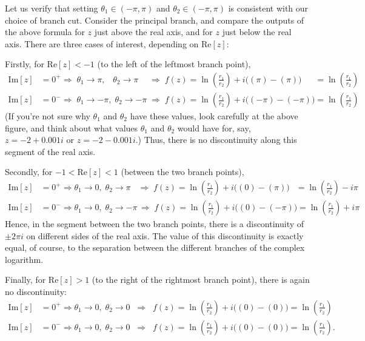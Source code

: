 \documentclass[10pt,a4paper]{article}
\begin{document}
Let us verify that setting $\theta_1 \in (-\pi,\pi)$ and $\theta_2 \in
(-\pi,\pi)$ is consistent with our choice of branch cut. Consider the
principal branch, and compare the outputs of the above formula for $z$
just above the real axis, and for $z$ just below the real axis.  There
are three cases of interest, depending on $\mathrm{Re}[z]$:

Firstly, for $\mathrm{Re}[z] < -1$ (to the left of the leftmost branch
point),
\begin{align}
  \mathrm{Im}[z] &= 0^+ \Rightarrow\; \theta_1 \rightarrow \pi, \;\;\; \theta_2 \rightarrow \pi\;\;\;\;\,\Rightarrow\; f(z) = \ln\!\left(\frac{r_1}{r_2}\right) + i\big((\pi) - (\pi)\big) \quad\;\; = \ln\left(\frac{r_1}{r_2}\right) \\
  \mathrm{Im}[z] &= 0^- \Rightarrow\; \theta_1 \rightarrow -\pi, \; \theta_2 \rightarrow -\pi \;\Rightarrow \; f(z) = \ln\!\left(\frac{r_1}{r_2}\right) + i\big((-\pi) - (-\pi)\big) = \ln\left(\frac{r_1}{r_2}\right)
\end{align}
(If you're not sure why $\theta_1$ and $\theta_2$ have these values,
look carefully at the above figure, and think about what values
$\theta_1$ and $\theta_2$ would have for, say, $z = -2 + 0.001i$ or $z
= -2 - 0.001i$.) Thus, there is no discontinuity along this segment of
the real axis.

Secondly, for $-1 < \mathrm{Re}[z] < 1$ (between the two branch
points),
\begin{align}
  \mathrm{Im}[z] &= 0^+ \Rightarrow \theta_1 \rightarrow 0, \; \theta_2 \rightarrow \pi \;\;\;\Rightarrow\; f(z) = \ln\!\left(\frac{r_1}{r_2}\right) + i\big((0) - (\pi)\big) \;\;\,= \ln\left(\frac{r_1}{r_2}\right) -i\pi \\
  \mathrm{Im}[z] &= 0^- \Rightarrow \theta_1 \rightarrow 0, \; \theta_2 \rightarrow -\pi \,\Rightarrow\; f(z) = \ln\!\left(\frac{r_1}{r_2}\right) + i\big((0) - (-\pi)\big) = \ln\left(\frac{r_1}{r_2}\right) + i\pi
\end{align}
Hence, in the segment between the two branch points, there is a
discontinuity of $\pm 2\pi i$ on different sides of the real axis.
The value of this discontinuity is exactly equal, of course, to the
separation between the different branches of the complex logarithm.

Finally, for $\mathrm{Re}[z] > 1$ (to the right of the rightmost
branch point), there is again no discontinuity:
\begin{align}
  \mathrm{Im}[z] &= 0^+ \Rightarrow \theta_1 \rightarrow 0, \; \theta_2 \rightarrow 0 \;\;\Rightarrow\;\; f(z) = \ln\!\left(\frac{r_1}{r_2}\right) + i\big((0) - (0)\big) = \ln\left(\frac{r_1}{r_2}\right) \\
  \mathrm{Im}[z] &= 0^- \Rightarrow \theta_1 \rightarrow 0, \; \theta_2 \rightarrow 0 \;\;\Rightarrow\;\; f(z) = \ln\!\left(\frac{r_1}{r_2}\right) + i\big((0) - (0)\big) = \ln\left(\frac{r_1}{r_2}\right).
\end{align}
\end{document}
